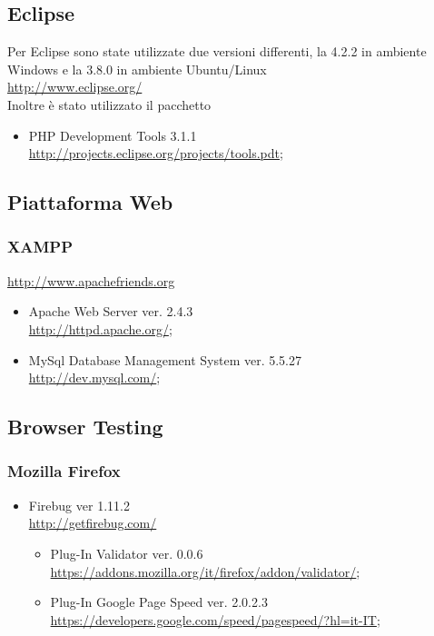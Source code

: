     \subsection{Eclipse}
      Per Eclipse sono state utilizzate due versioni differenti, la 4.2.2 in ambiente Windows e la 3.8.0 in ambiente Ubuntu/Linux \\
      \href{http://www.eclipse.org/}{http://www.eclipse.org/} \\
      Inoltre è stato utilizzato il pacchetto
      \begin{itemize}
       \item PHP Development Tools 3.1.1 \\
       \href{http://projects.eclipse.org/projects/tools.pdt}{http://projects.eclipse.org/projects/tools.pdt};
       
      \end{itemize}
    \subsection{Piattaforma Web}
      \subsubsection{XAMPP}
      \href{http://www.apachefriends.org}{http://www.apachefriends.org}
      \begin{itemize}
       \item Apache Web Server ver. 2.4.3 \\
	  \href{http://httpd.apache.org/}{http://httpd.apache.org/};
       \item MySql Database Management System ver. 5.5.27 \\
	  \href{http://dev.mysql.com/}{http://dev.mysql.com/};
      \end{itemize}
    \subsection{Browser Testing}
      \subsubsection{Mozilla Firefox}
	\begin{itemize}
	 \item Firebug ver 1.11.2 \\
	  \href{http://getfirebug.com/}{http://getfirebug.com/}
	    \begin{itemize}
	     \item Plug-In Validator ver. 0.0.6 \\
	      \href{https://addons.mozilla.org/it/firefox/addon/validator/}{https://addons.mozilla.org/it/firefox/addon/validator/};
	     \item Plug-In Google Page Speed ver. 2.0.2.3 \\
	      \href{https://developers.google.com/speed/pagespeed/?hl=it-IT}{https://developers.google.com/speed/pagespeed/?hl=it-IT};
	    \end{itemize}
	\end{itemize}
